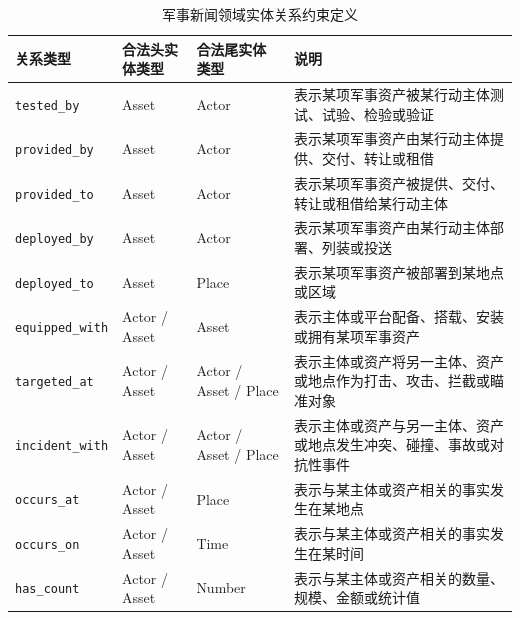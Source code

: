 \begin{table}[!htbp]
  \centering
  \caption{军事新闻领域实体关系约束定义}
  \label{tab:final_ontology_constraints}
  {
  \small
  \setlength{\tabcolsep}{4pt}
  \begin{tabularx}{0.96\textwidth}{
    >{\raggedright\arraybackslash}p{}
    >{\raggedright\arraybackslash}p{}
    >{\raggedright\arraybackslash}p{}
    >{\raggedright\arraybackslash}X
  }
    \toprule
    关系类型 & 合法头实体类型 & 合法尾实体类型 & 说明 \\
    \midrule
    \texttt{tested\_by}
    & Asset
    & Actor
    & 表示某项军事资产被某行动主体测试、试验、检验或验证 \\

    \texttt{provided\_by}
    & Asset
    & Actor
    & 表示某项军事资产由某行动主体提供、交付、转让或租借 \\

    \texttt{provided\_to}
    & Asset
    & Actor
    & 表示某项军事资产被提供、交付、转让或租借给某行动主体 \\

    \texttt{deployed\_by}
    & Asset
    & Actor
    & 表示某项军事资产由某行动主体部署、列装或投送 \\

    \texttt{deployed\_to}
    & Asset
    & Place
    & 表示某项军事资产被部署到某地点或区域 \\

    \texttt{equipped\_with}
    & Actor / Asset
    & Asset
    & 表示主体或平台配备、搭载、安装或拥有某项军事资产 \\

    \texttt{targeted\_at}
    & Actor / Asset
    & Actor / Asset / Place
    & 表示主体或资产将另一主体、资产或地点作为打击、攻击、拦截或瞄准对象 \\

    \texttt{incident\_with}
    & Actor / Asset
    & Actor / Asset / Place
    & 表示主体或资产与另一主体、资产或地点发生冲突、碰撞、事故或对抗性事件 \\

    \texttt{occurs\_at}
    & Actor / Asset
    & Place
    & 表示与某主体或资产相关的事实发生在某地点 \\

    \texttt{occurs\_on}
    & Actor / Asset
    & Time
    & 表示与某主体或资产相关的事实发生在某时间 \\

    \texttt{has\_count}
    & Actor / Asset
    & Number
    & 表示与某主体或资产相关的数量、规模、金额或统计值 \\
    \bottomrule
  \end{tabularx}}
\end{table}

